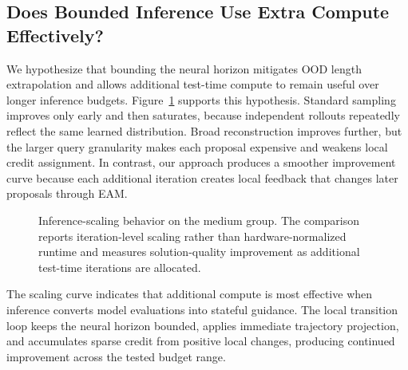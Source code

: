 \documentclass[11pt]{article}
\newcommand{\method}{\textsc{STAR}}
\newcommand{\EAM}{\textsc{EAM}}
\begin{document}
\subsection{Does Bounded Inference Use Extra Compute Effectively?}

We hypothesize that bounding the neural horizon mitigates OOD length extrapolation and allows additional test-time compute to remain useful over longer inference budgets. Figure~\ref{fig:scaling} supports this hypothesis. Standard sampling improves only early and then saturates, because independent rollouts repeatedly reflect the same learned distribution. Broad reconstruction improves further, but the larger query granularity makes each proposal expensive and weakens local credit assignment. In contrast, our approach produces a smoother improvement curve because each additional iteration creates local feedback that changes later proposals through \EAM{}.

\begin{figure}[t]
\centering
{}
\caption{Inference-scaling behavior on the medium group. The comparison reports iteration-level scaling rather than hardware-normalized runtime and measures solution-quality improvement as additional test-time iterations are allocated.}
\label{fig:scaling}
\end{figure}

The scaling curve indicates that additional compute is most effective when inference converts model evaluations into stateful guidance. The local transition loop keeps the neural horizon bounded, applies immediate trajectory projection, and accumulates sparse credit from positive local changes, producing continued improvement across the tested budget range.
\end{document}
